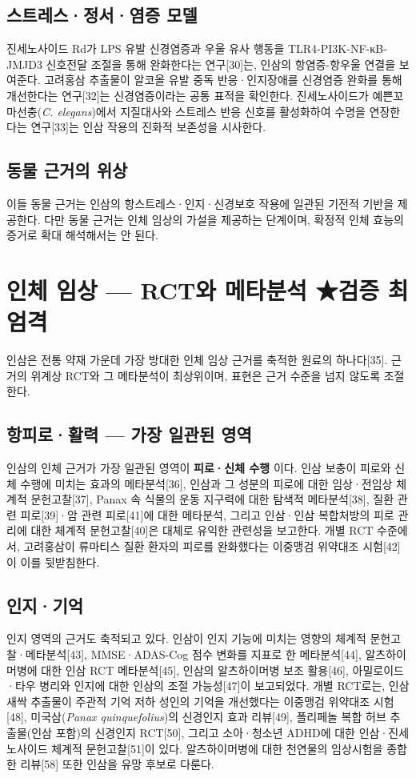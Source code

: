\documentclass[11pt,oneside]{book}
\begin{document}
\subsection{스트레스·정서·염증 모델}
진세노사이드 Rd가 LPS 유발 신경염증과 우울 유사 행동을 TLR4-PI3K-NF-κB-JMJD3 신호전달 조절을 통해 완화한다는 연구[30]는, 인삼의 항염증-항우울 연결을 보여준다. 고려홍삼 추출물이 알코올 유발 중독 반응·인지장애를 신경염증 완화를 통해 개선한다는 연구[32]는 신경염증이라는 공통 표적을 확인한다. 진세노사이드가 예쁜꼬마선충(\textit{C. elegans})에서 지질대사와 스트레스 반응 신호를 활성화하여 수명을 연장한다는 연구[33]는 인삼 작용의 진화적 보존성을 시사한다.

\subsection{동물 근거의 위상}
이들 동물 근거는 인삼의 항스트레스·인지·신경보호 작용에 일관된 기전적 기반을 제공한다. 다만 동물 근거는 인체 임상의 가설을 제공하는 단계이며, 확정적 인체 효능의 증거로 확대 해석해서는 안 된다.

\section{인체 임상 — RCT와 메타분석 ★검증 최엄격}
인삼은 전통 약재 가운데 가장 방대한 인체 임상 근거를 축적한 원료의 하나다[35]. 근거의 위계상 RCT와 그 메타분석이 최상위이며, 표현은 근거 수준을 넘지 않도록 조절한다.

\subsection{항피로·활력 — 가장 일관된 영역}
인삼의 인체 근거가 가장 일관된 영역이 \textbf{피로·신체 수행} 이다. 인삼 보충이 피로와 신체 수행에 미치는 효과의 메타분석[36], 인삼과 그 성분의 피로에 대한 임상·전임상 체계적 문헌고찰[37], Panax 속 식물의 운동 지구력에 대한 탐색적 메타분석[38], 질환 관련 피로[39]·암 관련 피로[41]에 대한 메타분석, 그리고 인삼·인삼 복합처방의 피로 관리에 대한 체계적 문헌고찰[40]은 대체로 유익한 관련성을 보고한다. 개별 RCT 수준에서, 고려홍삼이 류마티스 질환 환자의 피로를 완화했다는 이중맹검 위약대조 시험[42]이 이를 뒷받침한다.

\subsection{인지·기억}
인지 영역의 근거도 축적되고 있다. 인삼이 인지 기능에 미치는 영향의 체계적 문헌고찰·메타분석[43], MMSE·ADAS-Cog 점수 변화를 지표로 한 메타분석[44], 알츠하이머병에 대한 인삼 RCT 메타분석[45], 인삼의 알츠하이머병 보조 활용[46], 아밀로이드·타우 병리와 인지에 대한 인삼의 조절 가능성[47]이 보고되었다. 개별 RCT로는, 인삼 새싹 추출물이 주관적 기억 저하 성인의 기억을 개선했다는 이중맹검 위약대조 시험[48], 미국삼(\textit{Panax quinquefolius})의 신경인지 효과 리뷰[49], 폴리페놀 복합 허브 추출물(인삼 포함)의 신경인지 RCT[50], 그리고 소아·청소년 ADHD에 대한 인삼·진세노사이드 체계적 문헌고찰[51]이 있다. 알츠하이머병에 대한 천연물의 임상시험을 종합한 리뷰[58] 또한 인삼을 유망 후보로 다룬다.
\end{document}
